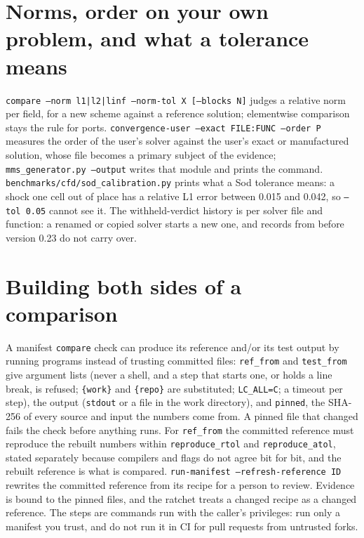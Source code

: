 \documentclass[11pt,a4paper]{report}
\begin{document}
\section{Norms, order on your own problem, and what a tolerance means}
\texttt{compare --norm l1|l2|linf --norm-tol X [--blocks N]} judges a relative norm per field, for a new scheme against a reference solution; elementwise comparison stays the rule for ports. \texttt{convergence-user --exact FILE:FUNC --order P} measures the order of the user's solver against the user's exact or manufactured solution, whose file becomes a primary subject of the evidence; \texttt{mms\_generator.py --output} writes that module and prints the command. \texttt{benchmarks/cfd/sod\_calibration.py} prints what a Sod tolerance means: a shock one cell out of place has a relative L1 error between 0.015 and 0.042, so \texttt{--tol 0.05} cannot see it. The withheld-verdict history is per solver file and function: a renamed or copied solver starts a new one, and records from before version 0.23 do not carry over.

\section{Building both sides of a comparison}
A manifest \texttt{compare} check can produce its reference and/or its test output by running programs instead of trusting committed files: \texttt{ref\_from} and \texttt{test\_from} give argument lists (never a shell, and a step that starts one, or holds a line break, is refused; \texttt{\{work\}} and \texttt{\{repo\}} are substituted; \texttt{LC\_ALL=C}; a timeout per step), the output (\texttt{stdout} or a file in the work directory), and \texttt{pinned}, the SHA-256 of every source and input the numbers come from. A pinned file that changed fails the check before anything runs. For \texttt{ref\_from} the committed reference must reproduce the rebuilt numbers within \texttt{reproduce\_rtol} and \texttt{reproduce\_atol}, stated separately because compilers and flags do not agree bit for bit, and the rebuilt reference is what is compared. \texttt{run-manifest --refresh-reference ID} rewrites the committed reference from its recipe for a person to review. Evidence is bound to the pinned files, and the ratchet treats a changed recipe as a changed reference. The steps are commands run with the caller's privileges: run only a manifest you trust, and do not run it in CI for pull requests from untrusted forks.
\end{document}
